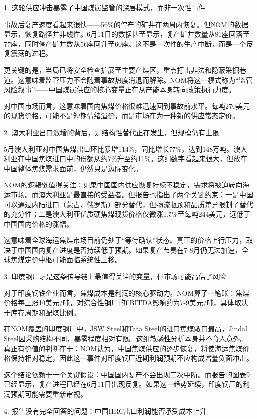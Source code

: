 \documentclass[11pt]{ctexart}
\begin{document}
1. 这轮供应冲击暴露了中国煤炭监管的深层模式，而非一次性事件

事故后复产速度看起来很快——56\%的停产的矿井在两周内恢复。但NOM的数据显示，恢复路径并非线性。6月11日的数据甚至显示，复产矿井数量从81座回落至77座，同时停产矿井数从56座回升至60座。这不是一次性的生产中断，而是一个反复震荡的过程。

更关键的是，当局已将安全检查扩展至主要产煤区，重点打击非法和隐蔽采掘巷道。这意味着监管压力不会随着事故热度消退而解除。NOM将这一模式称为“监管风险叙事”——中国煤炭供应的核心变量正在从产能本身转向政策执行力度。

对中国市场而言，这意味着国内焦煤价格很难迅速回到事故前水平。每吨270美元的现货价格，可能不是短期情绪溢价，而是市场在为一种新的供应常态定价。

2. 澳大利亚出口激增的背后，是结构性替代正在发生，但规模仍有上限

5月澳大利亚对中国焦煤出口环比暴增114\%，同比增长77\%，达到148万吨。澳大利亚在中国焦煤进口中的份额从约7\%升至约11\%。这组数字看起来很大，但放在中国整体焦煤需求面前，仍然只是边际变化。

NOM的逻辑链值得关注：如果中国国内供应恢复持续不稳定，需求将被迫转向海运市场。而澳大利亚是最直接的受益者。但报告也指出了两个关键约束：一是中国可以通过内陆进口（蒙古、俄罗斯）部分替代，但物流瓶颈和品质差异限制了替代的充分性；二是澳大利亚优质硬焦煤现货价格仅微涨1.5\%至每吨244美元，远低于中国国内价格的涨幅。

这意味着全球海运焦煤市场目前仍处于“等待确认”状态。真正的价格上行压力，取决于中国国内复产进度是否持续低于预期。如果复产节奏在7-8月仍无法加速，全球焦煤定价中枢可能面临系统性上移。

3. 印度钢厂才是这条传导链上最值得关注的变量，但市场可能高估了风险

对于印度钢铁企业而言，焦煤成本是利润的核心驱动力。NOM算了一笔账：焦煤价格每上涨10美元/吨，对综合性钢厂的EBITDA影响约为7-9美元/吨，具体取决于库存周期和配煤比例。

在NOM覆盖的印度钢厂中，JSW Steel和Tata Steel的进口焦煤敞口最高，Jindal Steel因采购结构不同，暴露程度相对有限。这组敏感性分析本身并不令人意外。真正有价值的判断在于：NOM认为，中国焦煤供应的逐步恢复，将使海运焦煤价格保持相对稳定，因此这一事件对印度钢厂近期利润预期不应构成增量负面冲击。

这个结论依赖于一个关键假设：中国国内复产不会出现二次中断。而报告的图表9已经显示，复产进程已经在6月11日出现反复。如果这一趋势延续，印度钢厂的利润预期可能需要重新审视。

4. 报告没有完全回答的问题：中国HRC出口利润能否承受成本上升
\end{document}
